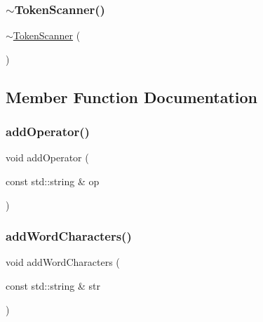 \subsubsection{\texorpdfstring{$\sim$\+Token\+Scanner()}{~TokenScanner()}}
{\footnotesize\ttfamily $\sim$\mbox{\hyperlink{classTokenScanner}{Token\+Scanner}} (\begin{DoxyParamCaption}{ }\end{DoxyParamCaption})\hspace{0.3cm}{\ttfamily [virtual]}}



\subsection{Member Function Documentation}
\mbox{\label{classTokenScanner_a5256bb7e66b4509946204727182994f9}} 
\subsubsection{\texorpdfstring{add\+Operator()}{addOperator()}}
{\footnotesize\ttfamily void add\+Operator (\begin{DoxyParamCaption}\item[{const std\+::string \&}]{op }\end{DoxyParamCaption})}

\mbox{\label{classTokenScanner_aed3e8321a04deee5d8bebce0d6d715ac}} 
\subsubsection{\texorpdfstring{add\+Word\+Characters()}{addWordCharacters()}}
{\footnotesize\ttfamily void add\+Word\+Characters (\begin{DoxyParamCaption}\item[{const std\+::string \&}]{str }\end{DoxyParamCaption})}

\mbox{\label{classTokenScanner_aa1ac28f13062f093eb32a49dce4c63f8}} 
